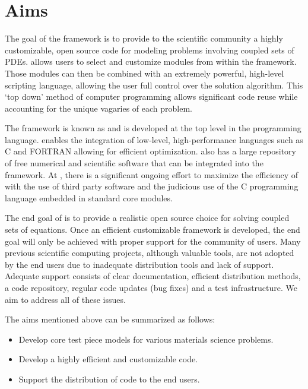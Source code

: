 \section{Aims}

The goal of the \FiPy{} framework is to provide to the scientific
community a highly customizable, open source code for modeling
problems involving coupled sets of PDEs.  \FiPy{} allows users to
select and customize modules from within the framework.  Those modules
can then be combined with an extremely powerful, high-level scripting
language, allowing the user full control over the solution algorithm.
This `top down' method of computer programming allows significant code
reuse while accounting for the unique vagaries of each problem.

The framework is known as \FiPy{} and is developed at the top level in
the \Python{} programming language.  \Python{} enables the integration
of low-level, high-performance languages such as C and FORTRAN
allowing for efficient optimization.  \Python{} also has a large
repository of free numerical and scientific software that can be
integrated into the \FiPy{} framework.  At \NIST{}, there is a
significant ongoing effort to maximize the efficiency of \FiPy{} with
the use of third party software and the judicious use of the C
programming language embedded in standard core modules.

The end goal of \FiPy{} is to provide a realistic open source choice
for solving coupled sets of equations. Once an efficient customizable
framework is developed, the end goal will only be achieved with proper
support for the community of users. Many previous scientific computing
projects, although valuable tools, are not adopted by the end users
due to inadequate distribution tools and lack of support. Adequate
support consists of clear documentation, efficient distribution
methods, a code repository, regular code updates (bug fixes) and a
test infrastructure. We aim to address all of these issues.

The aims mentioned above can be summarized as follows:

\begin{itemize}
    \item Develop core test piece models for various materials science problems.

    \item Develop a highly efficient and customizable code.

    \item Support the distribution of code to the end users.
\end{itemize}

